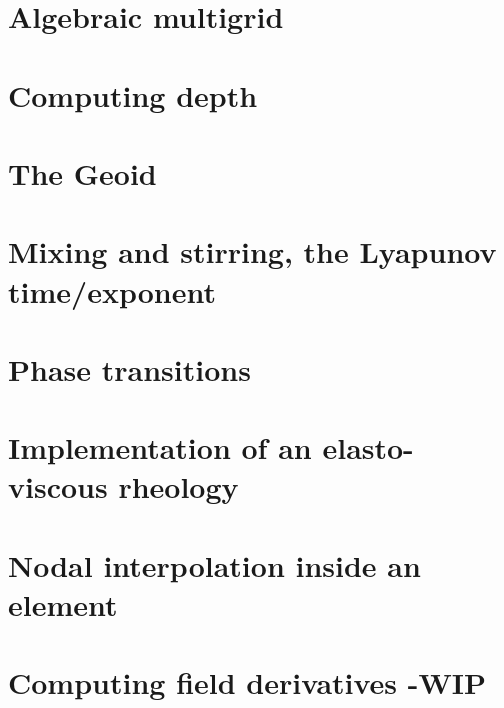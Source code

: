 \section{Algebraic multigrid}  %
\newpage %
\section{Computing depth \label{ss:depth}}  %
\newpage %
\section{The Geoid} \label{ss:geoid}  %
\newpage %
\section{Mixing and stirring, the Lyapunov time/exponent}\label{ss:lyapunov}
\newpage %
\section{Phase transitions}\label{ss:phasetransitions} %
\newpage %
\section{Implementation of an elasto-viscous rheology} \label{ss:evrheo}  %
\newpage %
\section{Nodal interpolation inside an element} \label{ss:bern}  %
\newpage %
\section{Computing field derivatives -WIP} \label{ss:nodderiv}  %
\newpage %
